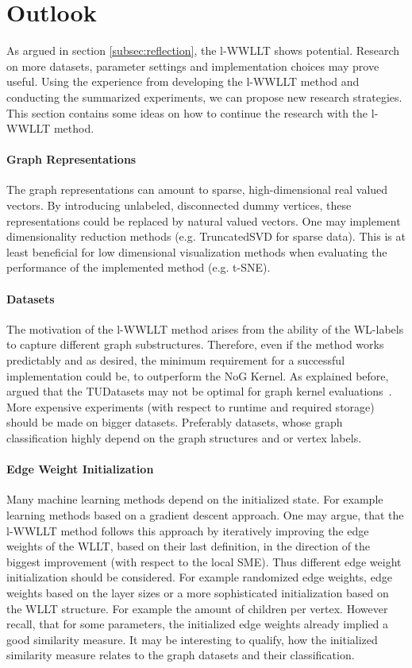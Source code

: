 \section{Outlook} \label{sec:outlook}
As argued in section \ref{subsec:reflection}, the l-WWLLT shows potential.
Research on more datasets, parameter settings and implementation choices may prove useful.
Using the experience from developing the l-WWLLT method and conducting the summarized experiments, we can propose new research strategies.
This section contains some ideas on how to continue the research with the l-WWLLT method.
    
    \paragraph{Graph Representations}
    The graph representations can amount to sparse, high-dimensional real valued vectors.
    By introducing unlabeled, disconnected dummy vertices, these representations could be replaced by natural valued vectors.
    One may implement dimensionality reduction methods (e.g. TruncatedSVD for sparse data).
    This is at least beneficial for low dimensional visualization methods when evaluating the performance of the implemented method (e.g. t-SNE).
    
    \paragraph{Datasets}
    The motivation of the l-WWLLT method arises from the ability of the WL-labels to capture different graph substructures.
    Therefore, even if the method works predictably and as desired, the minimum requirement for a successful implementation could be, to outperform the NoG Kernel.
    As explained before, \citeauthor{2019_Schulz_CONF} argued that the TUDatasets may not be optimal for graph kernel evaluations~\cite{2019_Schulz_CONF}.
    More expensive experiments (with respect to runtime and required storage) should be made on bigger datasets.
    Preferably datasets, whose graph classification highly depend on the graph structures and or vertex labels.

   	\paragraph{Edge Weight Initialization}
   	Many machine learning methods depend on the initialized state.
   	For example learning methods based on a gradient descent approach.
   	One may argue, that the l-WWLLT method follows this approach by iteratively improving the edge weights of the WLLT, based on their last definition, in the direction of the biggest improvement (with respect to the local SME).
   	Thus different edge weight initialization should be considered.
   	For example randomized edge weights, edge weights based on the layer sizes or a more sophisticated initialization based on the WLLT structure.
   	For example the amount of children per vertex. 
   	However recall, that for some parameters, the initialized edge weights already implied a good similarity measure.
   	It may be interesting to qualify, how the initialized similarity measure relates to the graph datasets and their classification.
   	
